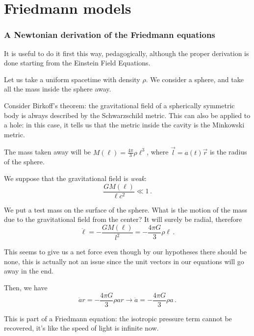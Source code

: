 \documentclass[main.tex]{subfiles}
\begin{document}
\chapter{Friedmann models}

\subsection{A Newtonian derivation of the Friedmann equations}

It is useful to do it first this way, pedagogically, although the proper derivation is done starting from the Einstein Field Equations.

Let us take a uniform spacetime with density \(\rho\). We consider a sphere, and take all the mass inside the sphere away.

Consider Birkoff's theorem: the gravitational field of a spherically symmetric body is always described by the Schwarzschild metric.
This can also be applied to a hole: in this case, it tells us that the metric inside the cavity is the Minkowski metric.

The mass taken away will be \(M(\ell) = \frac{4 \pi}{3} \rho \ell^{3}\), where \(\vec{l} = a(t) \vec{r}\) is the radius of the sphere.

We suppose that the gravitational field is \emph{weak}:
\begin{equation}
  \frac{GM(\ell)}{\ell c^2} \ll 1\,.
\end{equation}

We put a test mass on the surface of the sphere. What is the motion of the mass due to the gravitational field from the center? It will surely be radial, therefore
\begin{equation}
  \ddot{\ell} = - \frac{GM(\ell)}{l^2} = - \frac{4 \pi G}{3} \rho \ell\,.
\end{equation}

This seems to give us a net force even though by our hypotheses there should be none, this is actually not an issue since the unit vectors in our equations will go away in the end.

Then, we have
\begin{equation}
  \ddot{a} r = - \frac{4 \pi G}{3} \rho a r
  \to
  \ddot{a} = - \frac{4 \pi G}{3} \rho a\,.
\end{equation}

This is part of a Friedmann equation: the isotropic pressure term cannot be recovered, it's like the speed of light is infinite now.
\end{document}
